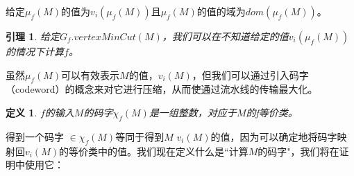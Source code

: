\documentclass{ctexart}
\newtheorem{definition}{定义}
\newtheorem{lemma}{引理}
\newtheorem{proof}{证明}
\begin{document}
给定$\mu_f(M)$的值为$v_i(\mu_f(M))$且$\mu_f(M)$的值的域为$dom(\mu_f(M))$。 %

\begin{lemma}
\label{lemma:M-to-mu}
给定$G_f.vertexMinCut(M)$，我们可以在不知道给定的值$v_i(\mu_f(M))$的情况下计算$f$。
\end{lemma}






虽然$\mu_f(M)$可以有效表示$M$的值，$v_i(M)$，但我们可以通过引入码字（codeword）的概念来对它进行压缩，从而使通过流水线的传输最大化。

\begin{definition} $f$的输入$M$的码字$\chi_f(M)$是一组整数，对应于$M$的f等价类。
\end{definition}

得到一个码字 $\in \chi_f(M)$等同于得到$M$ $v_i(M)$的值，因为可以确定地将码字映射回$v_i(M)$的等价类中的值。我们现在定义什么是``计算$M$的码字"，我们将在证明中使用它：
\end{document}
